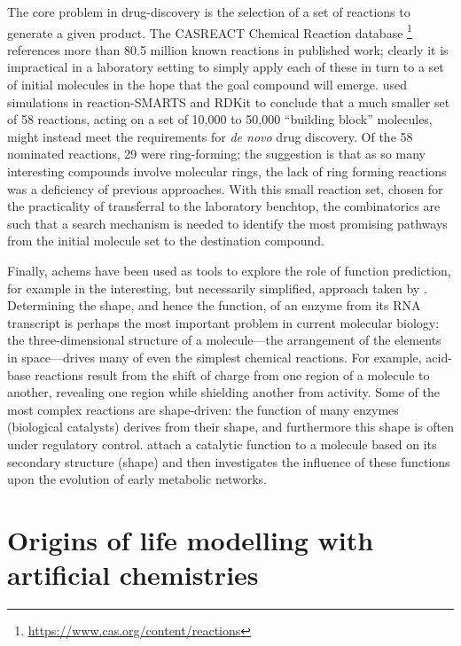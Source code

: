 The core problem in drug-discovery is the selection of a set of reactions to generate a given product. The CASREACT Chemical Reaction database \footnote{\url{https://www.cas.org/content/reactions}} references more than 80.5 million known reactions in published work; clearly it is impractical in a laboratory setting to simply apply each of these in turn to a set of initial molecules in the hope that the goal compound will emerge. \Textcite{Hartenfeller2012} used simulations in reaction-SMARTS and RDKit \parencite{rdkit} to conclude that a much smaller set of 58 reactions, acting on a set of 10,000 to 50,000 ``building block'' molecules, might instead meet the requirements for \textit{de novo} drug discovery. Of the 58 nominated reactions, 29 were ring-forming; the suggestion is that as so many interesting compounds involve molecular rings, the lack of ring forming reactions was a deficiency of previous approaches. With this small reaction set, chosen for the practicality of transferral to the laboratory benchtop, the combinatorics are such that a search mechanism is needed to identify the most promising pathways from the initial molecule set to the destination compound.

Finally, \Glspl{achem} have been used as tools to explore the role of function prediction, for example in the interesting, but necessarily simplified, approach taken by \textcite{Flamm2010,Ullrich2010}. Determining the shape, and hence the function, of an enzyme from its RNA transcript is perhaps the most important problem in current molecular biology: the three-dimensional structure of a molecule---the arrangement of the elements in space---drives many of even the simplest chemical reactions. For example, acid-base reactions result from the shift of charge from one region of a molecule to another, revealing one region while shielding another from activity. Some of the most complex reactions are shape-driven: the function of many enzymes (biological catalysts) derives from their shape, and furthermore this shape is often under regulatory control. \Textcite{Flamm2010,Ullrich2010} attach a catalytic function to a molecule based on its secondary structure (shape) and then investigates the influence of these functions upon the evolution of early metabolic networks. 
	
\section{Origins of life modelling with artificial chemistries}\label{achem-and-ool}

